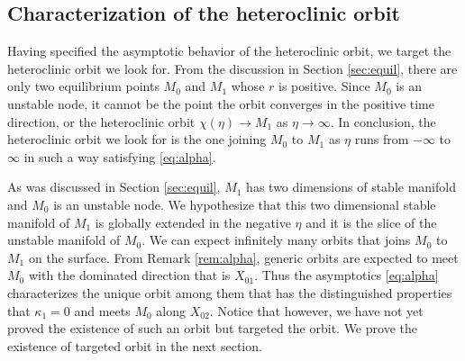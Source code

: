 \documentclass[a4paper,11pt]{article}
\begin{document}
\subsection{Characterization of the heteroclinic orbit}
Having specified the asymptotic behavior of the heteroclinic orbit, we target the heteroclinic orbit we look for. From the discussion in Section \ref{sec:equil}, there are only two equilibrium points $M_0$ and $M_1$ whose $r$ is positive. Since $M_0$ is an unstable node, it cannot be the point the orbit converges in the positive time direction, or the heteroclinic orbit $\chi(\eta) \rightarrow M_1$ as $\eta \rightarrow \infty$. In conclusion, the heteroclinic orbit we look for is the one joining $M_0$ to $M_1$ as $\eta$ runs from $-\infty$ to $\infty$ in such a way satisfying \eqref{eq:alpha}. 

As was discussed in Section \ref{sec:equil}, $M_1$ has two dimensions of stable manifold and $M_0$ is an unstable node. We hypothesize that this two dimensional stable manifold of $M_1$ is globally extended in the negative $\eta$ and it is the slice of the unstable manifold of $M_0$. We can expect infinitely many orbits that joins $M_0$ to $M_1$ on the surface. From Remark \ref{rem:alpha}, generic orbits are expected to meet $M_0$ with the dominated direction that is $X_{01}$. Thus the asymptotics \eqref{eq:alpha} characterizes the unique orbit among them that has the distinguished properties that $\kappa_1=0$ and meets $M_0$ along $X_{02}$. Notice that however, we have not yet proved the existence of such an orbit but targeted the orbit. We prove the existence of targeted orbit in the next section.
\end{document}
